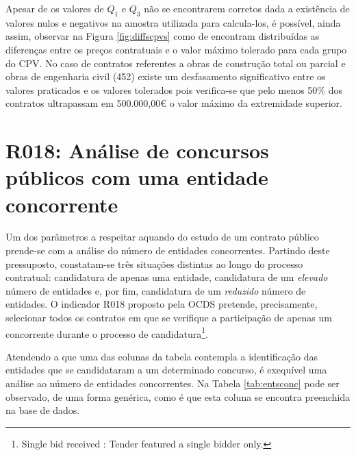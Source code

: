 Apesar de os valores de $Q_1$ e $Q_3$ não se encontrarem corretos dada a existência de valores nulos e negativos na amostra utilizada para calcula-los, é possível, ainda assim, observar na Figura \ref{fig:diffscpvs} como de encontram distribuídas as diferenças entre os preços contratuais e o valor máximo tolerado para cada grupo do CPV. No caso de contratos referentes a obras de construção total ou parcial e obras de engenharia civil (452) existe um desfasamento significativo entre os valores praticados e os valores tolerados pois verifica-se que pelo menos 50\% dos contratos ultrapassam em 500.000,00€ o valor máximo da extremidade superior. 


















\section{R018: Análise de concursos públicos com uma entidade concorrente}
\label{ch:entis}

Um dos parâmetros a respeitar aquando do estudo de um contrato público prende-se com a análise do número de entidades concorrentes. Partindo deste pressuposto, constatam-se três situações distintas ao longo do processo contratual: candidatura de apenas uma entidade, candidatura de um \textit{elevado} número de entidades e, por fim, candidatura de um \textit{reduzido} número de entidades. O indicador R018 proposto pela OCDS pretende, precisamente,  selecionar todos os contratos em que se verifique a participação de apenas um concorrente durante o processo de candidatura\footnote{Single bid received : Tender featured a single bidder only.}.

Atendendo a  que uma das colunas da tabela contempla a  identificação das entidades que se candidataram a um determinado concurso, é exequível uma análise ao número de entidades concorrentes. Na Tabela \ref{tab:entsconc} pode ser observado, de uma forma genérica, como é que esta coluna se encontra preenchida na base de dados. 


